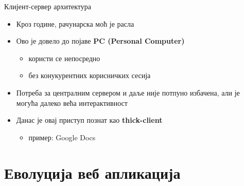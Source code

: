\documentclass{beamer}
\begin{document}
\begin{frame}[allowframebreaks]{Клијент-сервер архитектура}
        \framebreak
        
        \begin{itemize}
            \item Кроз године, рачунарска моћ је расла
            \item Ово је довело до појаве \textbf{PC (Personal Computer)}
            \begin{itemize}
                \item користи се непосредно
                \item без конукурентних корисничких сесија
            \end{itemize}
            \item Потреба за централним сервером и даље није потпуно избачена, али је могућа далеко већа интерактивност
            \item Данас је овај приступ познат као \textbf{thick-client}
            \begin{itemize}
                \item пример: Google Docs
            \end{itemize}
        \end{itemize}
    \end{frame}
    
    \section{Еволуција веб апликација}
    
\end{document}
